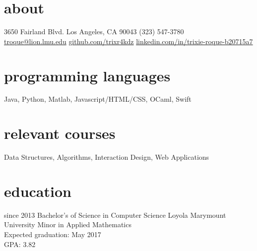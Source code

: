\documentclass[]{friggeri-cv} %
\begin{document}


\begin{aside} %
  \section{about}
    3650 Fairland Blvd.
    Los Angeles, CA 90043
    (323) 547-3780
    ~
    \href{mailto:troque@lion.lmu.edu}{troque@lion.lmu.edu}
    \href{http://github.com/trixr4kdz}{github.com/trixr4kdz}
    \href{http://linkedin.com/in/trixie-roque-b20715a7}{linkedin.com/in/trixie-roque-b20715a7}
  \section{programming languages}
    Java, Python, Matlab, Javascript/HTML/CSS, OCaml, Swift
  \section{relevant courses}
     Data Structures,
     Algorithms,
     Interaction Design,
     Web Applications
\end{aside}


\section{education}

  \begin{entrylist}


    \entry
      {since 2013}
      {Bachelor's of Science {\normalfont in Computer Science}}
      {Loyola Marymount University}
      {Minor {\normalfont in Applied Mathematics} \\ 
      Expected graduation: May 2017 \\
      GPA: 3.82}


\end{entrylist}
\end{document}
